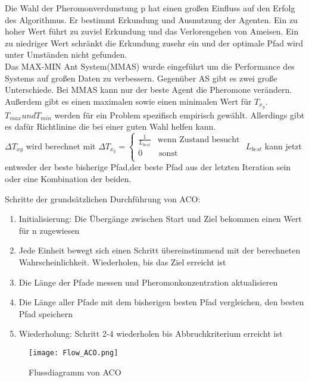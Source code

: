 Die Wahl der Pheromonverdunstung p hat einen großen Einfluss auf den Erfolg des Algorithmus. Er bestimmt Erkundung und Ausnutzung der Agenten. Ein zu hoher Wert führt zu zuviel Erkundung und das Verlorengehen von Ameisen. Ein zu niedriger Wert schränkt die Erkundung zusehr ein und der optimale Pfad wird unter Umständen nicht gefunden.\\
Das MAX-MIN Ant System(MMAS) wurde eingeführt um die Performance des Systems auf großen Daten zu verbessern. Gegenüber AS gibt es zwei große Unterschiede.  Bei MMAS kann nur der beste Agent die Pheromone verändern. Außerdem gibt es einen maximalen sowie einen minimalen Wert für $T_x_y$. $T_{max} und T_{min}$ werden für ein Problem spezifisch empirisch gewählt\cite{socha2002max}. Allerdings gibt es dafür Richtlinine die bei einer guten Wahl helfen kann\cite*{STUTZLE2000889}.\\ $\Delta T_{xy}$ wird berechnet mit $\Delta T_x_y = \left\{
  \begin{array}{ll}
  \frac{1}{L_{best}} & \textrm{wenn Zustand besucht} \\
  0 & \, \textrm{sonst} \\
  \end{array}
  \right. $
$L_{best}$ kann jetzt entweder der beste bisherige Pfad,der beste Pfad aus der letzten Iteration sein oder eine Kombination der beiden.


Schritte der grundsätzlichen Durchführung von ACO:
\begin{enumerate}
  \item Initialisierung: Die Übergänge zwischen Start und Ziel bekommen einen Wert für n zugewiesen
  \item Jede Einheit bewegt sich einen Schritt übereinstimmend mit der berechneten Wahrscheinlichkeit.  Wiederholen, bis das Ziel erreicht ist
  \item Die Länge der Pfade messen und Pheromonkonzentration aktualisieren
  \item Die Länge aller Pfade mit dem bisherigen besten Pfad vergleichen, den besten Pfad speichern
  \item Wiederholung: Schritt 2-4 wiederholen bis Abbruchkriterium erreicht ist
\end{enumerate}

\begin{figure}
  \centering
  \texttt{[image: Flow\_ACO.png]}
  \caption{Flussdiagramm von ACO}
  \label{fig:Figure_ACO}
\end{figure}

